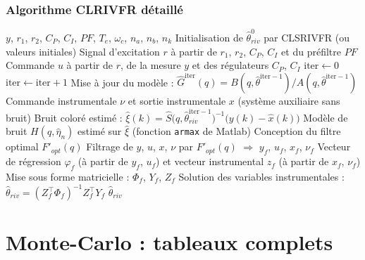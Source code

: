 \documentclass{style/presentation}
\begin{document}
\begin{frame}
    \frametitle{Algorithme CLRIVFR détaillé}
    {\footnotesize
    \begin{algorithmic}[1]
        \Require $y$, $r_1$, $r_2$, $C_P$, $C_I$, $P\!F$, $T_e$, $\omega_c$, $n_a$, $n_b$, $n_k$
        \State Initialisation de $\hat{\theta}_{riv}^0$ par CLSRIVFR (ou valeurs initiales)
        \State Signal d'excitation $r$ à partir de $r_1$, $r_2$, $C_P$, $C_I$ et du préfiltre $P\!F$
        \State Commande $u$ à partir de $r$, de la mesure $y$ et des régulateurs $C_P$, $C_I$
        \State $\text{iter} \gets 0$
        \Do
            \State $\text{iter} \gets \text{iter} + 1$
            \State Mise à jour du modèle : $\hat{G}^{\text{iter}}(q) = B(q,\hat{\theta}^{\text{iter}-1}) / A(q,\hat{\theta}^{\text{iter}-1})$
            \State Commande instrumentale $\nu$ et sortie instrumentale $x$ (système auxiliaire sans bruit)
            \State Bruit coloré estimé : $\hat{\xi}(k) = \hat{S}\bigl(q,\hat{\theta}_{riv}^{\text{iter}-1}\bigr)^{-1}\bigl(y(k) - \hat{x}(k)\bigr)$
            \State Modèle de bruit $H(q,\hat{\eta}_n)$ estimé sur $\hat{\xi}$ (fonction \texttt{armax} de Matlab)
            \State Conception du filtre optimal $F'_{opt}(q)$
            \State Filtrage de $y$, $u$, $x$, $\nu$ par $F'_{opt}(q)$ $\Rightarrow$ $y_f$, $u_f$, $x_f$, $\nu_f$
            \State Vecteur de régression $\varphi_f$ (à partir de $y_f$, $u_f$) et vecteur instrumental $z_f$ (à partir de $x_f$, $\nu_f$)
            \State Mise sous forme matricielle : $\Phi_f$, $Y_f$, $Z_f$
            \State Solution des variables instrumentales : $\hat{\theta}_{riv} = \left(Z_f^\top \Phi_f\right)^{-1} Z_f^\top Y_f$
        \Ensure $\hat{\theta}_{riv}$
    \end{algorithmic}}
\end{frame}

\section{Monte-Carlo : tableaux complets}
\end{document}
